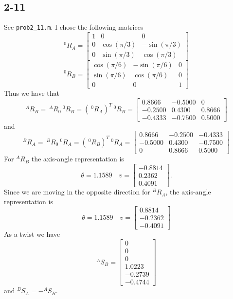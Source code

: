 \documentclass{../homework}
\begin{document}
\begin{parts}[n]
\begin{parts}
        \part{2-11}
        See \texttt{prob2\_11.m}. I chose the following matrices
        \[
            ^0R_A = 
            \begin{bmatrix}
            1 &     0    &    0      \\
            0 & \cos(\pi/3) & -\sin(\pi/3) \\
            0 & \sin(\pi/3) & \cos(\pi/3)
            \end{bmatrix}
        \]
        \[
            ^0R_B = 
            \begin{bmatrix}
            \cos(\pi/6) & -\sin(\pi/6) & 0 \\
            \sin(\pi/6) & \cos(\pi/6)  & 0 \\
            0     &    0      & 1
            \end{bmatrix}
        \]
        Thus we have that
        \[
            ^AR_B =\ ^AR_0\ ^0R_B = (\ ^0R_A)^T\ ^0R_B
            =
            \begin{bmatrix}
                0.8666 & -0.5000 & 0 \\
                -0.2500 & 0.4300 & 0.8666 \\
                -0.4333 & -0.7500 & 0.5000
            \end{bmatrix}
        \]
        and 
        \[
            ^BR_A =\ ^BR_0\ ^0R_A = (\ ^0R_B)^T\ ^0R_A
            =
            \begin{bmatrix}
                0.8666 & -0.2500 & -0.4333 \\
                -0.5000 & 0.4300 & -0.7500 \\
                0 & 0.8666 & 0.5000
            \end{bmatrix}
        \]
        For $^AR_B$ the axis-angle representation is
        \[
            \theta = 1.1589 \quad
            v = \begin{bmatrix}
            -0.8814 \\
            0.2362 \\
            0.4091
            \end{bmatrix}.
        \]
        Since we are moving in the opposite direction for $^BR_A$, the axis-angle representation is
        \[
            \theta = 1.1589 \quad
            v = \begin{bmatrix}
                0.8814 \\
                -0.2362 \\
                -0.4091
            \end{bmatrix}
        \]
        As a twist we have
        \[
            ^AS_B = 
            \begin{bmatrix}
               0 \\
               0 \\
               0 \\
               1.0223 \\
               -0.2739 \\
               -0.4744
            \end{bmatrix}
        \]
        and $^BS_A = -^AS_B$.

\end{parts}
\end{parts}
\end{document}
